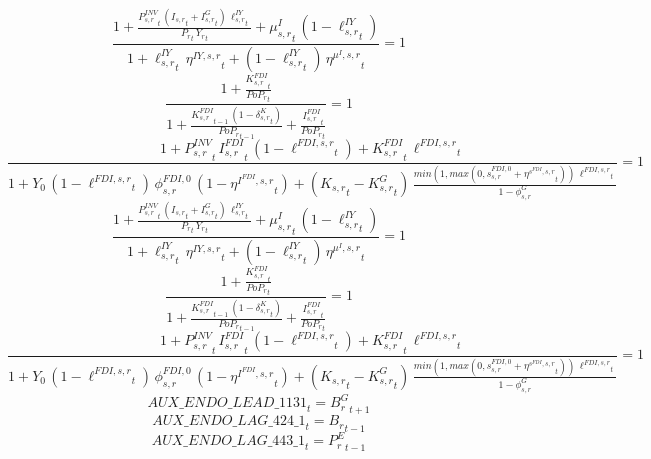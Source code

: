 \noindent[name= `Investment-to-GDP wedge 4 1']
\begin{dmath}
\frac{1+\frac{{{P^{INV}_{s,r}}}_{t}\, \left({{I_{s,r}}}_{t}+{{I^G_{s,r}}}_{t}\right)\, {{\ell^{IY}_{s,r}}}_{t}}{{{P_{r}}}_{t}\, {{Y_r}}_{t}}+{{\mu^{I}_{s,r}}}_{t}\, \left(1-{{\ell^{IY}_{s,r}}}_{t}\right)}{1+{{\ell^{IY}_{s,r}}}_{t}\, {{\eta^{IY,s,r}}}_{t}+\left(1-{{\ell^{IY}_{s,r}}}_{t}\right)\, {{\eta^{\mu^{I},s,r}}}_{t}}=1
\end{dmath}
\noindent[name= `K\_FDI LOM 4 1']
\begin{dmath}
\frac{1+\frac{{{K^{FDI}_{s,r}}}_{t}}{{{PoP_r}}_{t}}}{1+\frac{{{K^{FDI}_{s,r}}}_{t-1}\, \left(1-{{\delta^{K}_{s,r}}}_{t}\right)}{{{PoP_r}}_{t-1}}+\frac{{{I^{FDI}_{s,r}}}_{t}}{{{PoP_r}}_{t}}}=1
\end{dmath}
\noindent[name= `I-FDI target 4 1']
\begin{dmath}
\frac{1+{{P^{INV}_{s,r}}}_{t}\, {{I^{FDI}_{s,r}}}_{t}\, \left(1-{{\ell^{FDI,s,r}}}_{t}\right)+{{K^{FDI}_{s,r}}}_{t}\, {{\ell^{FDI,s,r}}}_{t}}{1+{{Y_0}}\, \left(1-{{\ell^{FDI,s,r}}}_{t}\right)\, {{\phi^{FDI,0}_{s,r}}}\, \left(1-{{\eta^{I^{FDI},s,r}}}_{t}\right)+\left({{K_{s,r}}}_{t}-{{K^G_{s,r}}}_{t}\right)\, \frac{min(1,max(0,{{s^{FDI,0}_{s,r}}}+{{\eta^{s^{FDI},s,r}}}_{t}))\, {{\ell^{FDI,s,r}}}_{t}}{1-{{\phi^{G}_{s,r}}}}}=1
\end{dmath}
\noindent[name= `Investment-to-GDP wedge 5 1']
\begin{dmath}
\frac{1+\frac{{{P^{INV}_{s,r}}}_{t}\, \left({{I_{s,r}}}_{t}+{{I^G_{s,r}}}_{t}\right)\, {{\ell^{IY}_{s,r}}}_{t}}{{{P_{r}}}_{t}\, {{Y_r}}_{t}}+{{\mu^{I}_{s,r}}}_{t}\, \left(1-{{\ell^{IY}_{s,r}}}_{t}\right)}{1+{{\ell^{IY}_{s,r}}}_{t}\, {{\eta^{IY,s,r}}}_{t}+\left(1-{{\ell^{IY}_{s,r}}}_{t}\right)\, {{\eta^{\mu^{I},s,r}}}_{t}}=1
\end{dmath}
\noindent[name= `K\_FDI LOM 5 1']
\begin{dmath}
\frac{1+\frac{{{K^{FDI}_{s,r}}}_{t}}{{{PoP_r}}_{t}}}{1+\frac{{{K^{FDI}_{s,r}}}_{t-1}\, \left(1-{{\delta^{K}_{s,r}}}_{t}\right)}{{{PoP_r}}_{t-1}}+\frac{{{I^{FDI}_{s,r}}}_{t}}{{{PoP_r}}_{t}}}=1
\end{dmath}
\noindent[name= `I-FDI target 5 1']
\begin{dmath}
\frac{1+{{P^{INV}_{s,r}}}_{t}\, {{I^{FDI}_{s,r}}}_{t}\, \left(1-{{\ell^{FDI,s,r}}}_{t}\right)+{{K^{FDI}_{s,r}}}_{t}\, {{\ell^{FDI,s,r}}}_{t}}{1+{{Y_0}}\, \left(1-{{\ell^{FDI,s,r}}}_{t}\right)\, {{\phi^{FDI,0}_{s,r}}}\, \left(1-{{\eta^{I^{FDI},s,r}}}_{t}\right)+\left({{K_{s,r}}}_{t}-{{K^G_{s,r}}}_{t}\right)\, \frac{min(1,max(0,{{s^{FDI,0}_{s,r}}}+{{\eta^{s^{FDI},s,r}}}_{t}))\, {{\ell^{FDI,s,r}}}_{t}}{1-{{\phi^{G}_{s,r}}}}}=1
\end{dmath}
\begin{dmath}
{AUX\_ENDO\_LEAD\_1131}_{t}={{B^G_{r}}}_{t+1}
\end{dmath}
\begin{dmath}
{AUX\_ENDO\_LAG\_424\_1}_{t}={{B_r}}_{t-1}
\end{dmath}
\begin{dmath}
{AUX\_ENDO\_LAG\_443\_1}_{t}={{P^E_r}}_{t-1}
\end{dmath}
